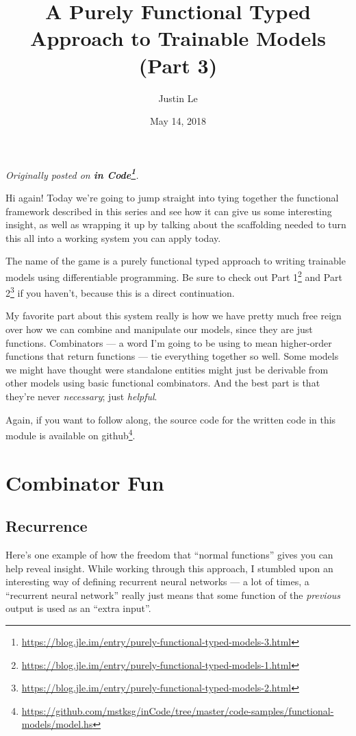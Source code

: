 \documentclass[]{article}
\title{A Purely Functional Typed Approach to Trainable Models (Part 3)}
\author{Justin Le}
\date{May 14, 2018}
\renewcommand{\href}[2]{#2\footnote{\url{#1}}}
\begin{document}
\maketitle

\emph{Originally posted on
\textbf{\href{https://blog.jle.im/entry/purely-functional-typed-models-3.html}{in
Code}}.}

Hi again! Today we're going to jump straight into tying together the functional
framework described in this series and see how it can give us some interesting
insight, as well as wrapping it up by talking about the scaffolding needed to
turn this all into a working system you can apply today.

The name of the game is a purely functional typed approach to writing trainable
models using differentiable programming. Be sure to check out
\href{https://blog.jle.im/entry/purely-functional-typed-models-1.html}{Part 1}
and \href{https://blog.jle.im/entry/purely-functional-typed-models-2.html}{Part
2} if you haven't, because this is a direct continuation.

My favorite part about this system really is how we have pretty much free reign
over how we can combine and manipulate our models, since they are just
functions. Combinators --- a word I'm going to be using to mean higher-order
functions that return functions --- tie everything together so well. Some models
we might have thought were standalone entities might just be derivable from
other models using basic functional combinators. And the best part is that
they're never \emph{necessary}; just \emph{helpful}.

Again, if you want to follow along, the source code for the written code in this
module is available
\href{https://github.com/mstksg/inCode/tree/master/code-samples/functional-models/model.hs}{on
github}.

\hypertarget{combinator-fun}{%
\section{Combinator Fun}\label{combinator-fun}}

\hypertarget{recurrence}{%
\subsection{Recurrence}\label{recurrence}}

Here's one example of how the freedom that ``normal functions'' gives you can
help reveal insight. While working through this approach, I stumbled upon an
interesting way of defining recurrent neural networks --- a lot of times, a
``recurrent neural network'' really just means that some function of the
\emph{previous} output is used as an ``extra input''.
\end{document}
